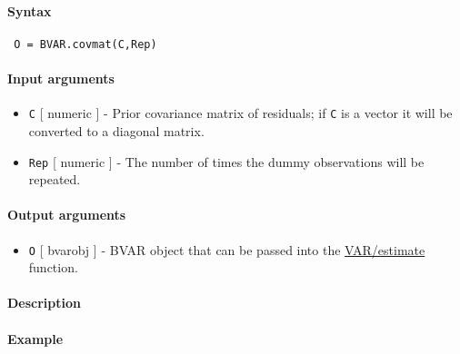 


	\paragraph{Syntax}
 
 \begin{verbatim}
 O = BVAR.covmat(C,Rep)
 \end{verbatim}
 
 \paragraph{Input arguments}
 
 \begin{itemize}
 \item
   \texttt{C} {[} numeric {]} - Prior covariance matrix of residuals; if
   \texttt{C} is a vector it will be converted to a diagonal matrix.
 \item
   \texttt{Rep} {[} numeric {]} - The number of times the dummy
   observations will be repeated.
 \end{itemize}
 
 \paragraph{Output arguments}
 
 \begin{itemize}
 \item
   \texttt{O} {[} bvarobj {]} - BVAR object that can be passed into the
   \url{VAR/estimate} function.
 \end{itemize}
 
 \paragraph{Description}
 
 \paragraph{Example}


